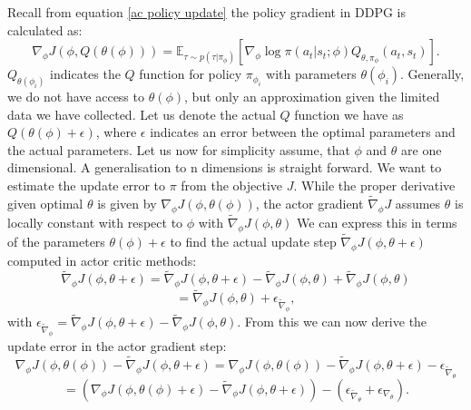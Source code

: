 Recall from equation \ref{ac policy update} the policy gradient in DDPG is calculated as:
\begin{equation}
    \nabla_{\phi} J(\phi, Q(\theta(\phi))) = \mathbb{E}_{\tau \sim p(\tau | \pi_{\phi})} \left[\nabla_{\phi} \log \pi(a_t|s_t;\phi) Q_{\theta, \pi_\phi}(a_t, s_t) \right].
\end{equation}
$Q_{\theta(\phi_i)}$ indicates the $Q$ function for policy $\pi_{\phi_{i}}$ with parameters 
$\theta(\phi_i)$. 
Generally, we do not have access to $\theta(\phi)$, but only an approximation given the limited data we have collected. Let us denote the actual 
$Q$ function we have as $Q(\theta(\phi) + \epsilon)$, where $\epsilon$ indicates an error between the optimal parameters and the actual parameters.
Let us now for simplicity assume, that $\phi$ and $\theta$ are one dimensional. A generalisation to n dimensions is straight forward. We want 
to estimate the update error to $\pi$ from the objective $J$. While the proper derivative given optimal $\theta$ is given by $\nabla_{\phi} J(\phi, \theta(\phi))$,
the actor gradient $\widetilde{\nabla}_\phi J$ assumes $\theta$ is locally constant with respect to $\phi$ with $\widetilde{\nabla}_\phi J(\phi, \theta)$ 
We can express this in terms of the parameters $\theta(\phi) + \epsilon$ to 
find the actual update step $\widetilde{\nabla}_{\phi} J(\phi, \theta + \epsilon)$ computed in actor critic methods:
\begin{equation*}
    \widetilde{\nabla}_{\phi} J(\phi, \theta + \epsilon) = \widetilde{\nabla}_{\phi} J(\phi, \theta + \epsilon) - \widetilde{\nabla}_{\phi} J(\phi, \theta) + \widetilde{\nabla}_{\phi} J(\phi, \theta)
\end{equation*}
\begin{equation*}
    = \widetilde{\nabla}_{\phi} J(\phi, \theta) + \epsilon_{\widetilde{\nabla}_{\phi}},
\end{equation*}
with $\epsilon_{\widetilde{\nabla}_{\phi}} = \widetilde{\nabla}_{\phi} J(\phi, \theta + \epsilon) - \widetilde{\nabla}_{\phi} J(\phi, \theta)$.
From this we can now derive the update error in the actor gradient step:
\begin{equation}
    \label{equation:general_update_error}
    \nabla_{\phi} J(\phi, \theta(\phi)) - \widetilde{\nabla}_\phi J(\phi, \theta + \epsilon) = \nabla_{\phi} J(\phi, \theta(\phi)) - \widetilde{\nabla}_\phi J(\phi, \theta + \epsilon) - \epsilon_{\widetilde{\nabla}_{\theta}}
\end{equation}
\begin{equation*}
    = \left(\nabla_{\phi} J(\phi, \theta(\phi) + \epsilon) - \widetilde{\nabla}_\phi J(\phi, \theta + \epsilon)\right) - \left( \epsilon_{\widetilde{\nabla}_{\theta}} + \epsilon_{\nabla_{\theta}} \right).
\end{equation*}
